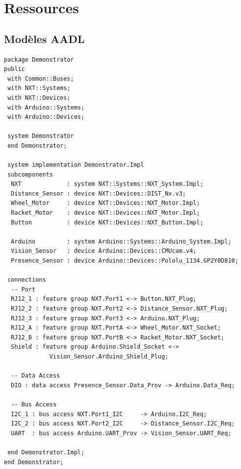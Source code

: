 \chapter{Ressources}
  \section{Modèles AADL}
  \label{ann:aadl}



\begin{lstlisting}
package Demonstrator
public
 with Common::Buses;
 with NXT::Systems;
 with NXT::Devices;
 with Arduino::Systems; 
 with Arduino::Devices;
 
 system Demonstrator
 end Demonstrator;
 
 system implementation Demonstrator.Impl
 subcomponents
  NXT             : system NXT::Systems::NXT_System.Impl;
  Distance_Sensor : device NXT::Devices::DIST_Nx.v3;
  Wheel_Motor     : device NXT::Devices::NXT_Motor.Impl;
  Racket_Motor    : device NXT::Devices::NXT_Motor.Impl;
  Button          : device NXT::Devices::NXT_Button.Impl;

  Arduino         : system Arduino::Systems::Arduino_System.Impl;
  Vision_Sensor   : device Arduino::Devices::CMUcam.v4;
  Presence_Sensor : device Arduino::Devices::Pololu_1134.GP2Y0D810;
  
 connections
  -- Port 
  RJ12_1 : feature group NXT.Port1 <-> Button.NXT_Plug;
  RJ12_2 : feature group NXT.Port2 <-> Distance_Sensor.NXT_Plug;
  RJ12_3 : feature group NXT.Port3 <-> Arduino.NXT_Plug;
  RJ12_A : feature group NXT.PortA <-> Wheel_Motor.NXT_Socket;
  RJ12_B : feature group NXT.PortB <-> Racket_Motor.NXT_Socket;
  Shield : feature group Arduino.Shield_Socket <->
             Vision_Sensor.Arduino_Shield_Plug;
  
  -- Data Access
  DIO : data access Presence_Sensor.Data_Prov -> Arduino.Data_Req;
  
  -- Bus Access
  I2C_1 : bus access NXT.Port1_I2C     -> Arduino.I2C_Req;
  I2C_2 : bus access NXT.Port2_I2C     -> Distance_Sensor.I2C_Req;
  UART  : bus access Arduino.UART_Prov -> Vision_Sensor.UART_Req;

 end Demonstrator.Impl;
end Demonstrator;
\end{lstlisting}

